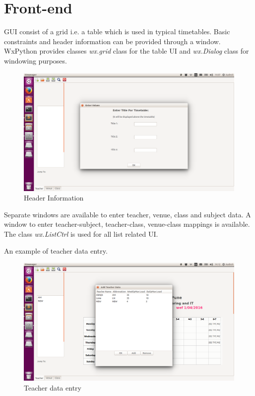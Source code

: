 \newpage
\section{Front-end}
GUI consist of a grid i.e. a table which is used in typical timetables. Basic constraints and header information can be provided through a window. WxPython provides classes \textit{wx.grid} class for the table UI and \textit{wx.Dialog} class for windowing purposes.

\begin{figure}[ht!]
	\centering
	\includegraphics[width=140mm]{2.png}
	\caption{Header Information}
\end{figure}

Separate windows are available to enter teacher, venue, class and subject data. A window to enter teacher-subject, teacher-class, venue-class mappings is available. The class \textit{wx.ListCtrl} is used for all list related UI.

\newpage
An example of teacher data entry.
\begin{figure}[ht!]
	\centering
	\includegraphics[width=160mm]{5.png}
	\caption{Teacher data entry}
\end{figure}

